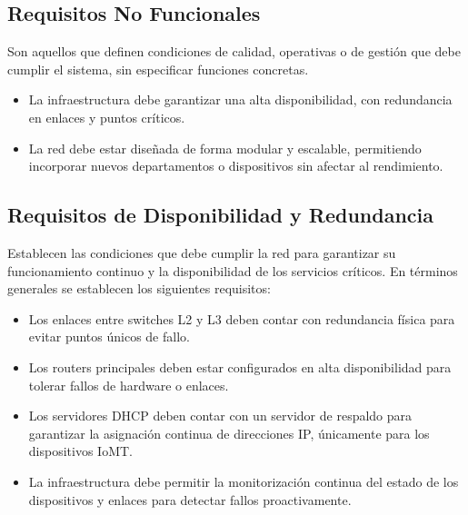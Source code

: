 \subsection{Requisitos No Funcionales}
Son aquellos que definen condiciones de calidad, operativas o de gestión que debe cumplir el sistema, sin especificar funciones concretas.
\begin{itemize}
    \item La infraestructura debe garantizar una alta disponibilidad, con redundancia en enlaces y puntos críticos.
    \item La red debe estar diseñada de forma modular y escalable, permitiendo incorporar nuevos departamentos o dispositivos sin afectar al rendimiento.
\end{itemize}
\subsection{Requisitos de Disponibilidad y Redundancia}
Establecen las condiciones que debe cumplir la red para garantizar su funcionamiento continuo y la disponibilidad de los servicios críticos. En términos generales se establecen los siguientes requisitos:
\begin{itemize}
    \item Los enlaces entre switches L2 y L3 deben contar con redundancia física para evitar puntos únicos de fallo.
    \item Los routers principales deben estar configurados en alta disponibilidad para tolerar fallos de hardware o enlaces.
    \item Los servidores DHCP deben contar con un servidor de respaldo para garantizar la asignación continua de direcciones IP, únicamente para los dispositivos IoMT.
    \item La infraestructura debe permitir la monitorización continua del estado de los dispositivos y enlaces para detectar fallos proactivamente.
\end{itemize}

